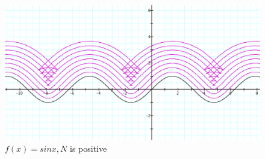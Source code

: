 \begin{figure}[h] 
  \label{example-2}
  \centering
  \begin{minipage}[b]{0.8\linewidth}
    \centering
    \includegraphics[width=.9\linewidth]{some-examples-img/Fig 7.png}
    \caption{$f(x) = sin x, N$ is positive}
    \label{fig:fig7}
    \vspace{4ex}
  \end{minipage} %
\end{figure}

